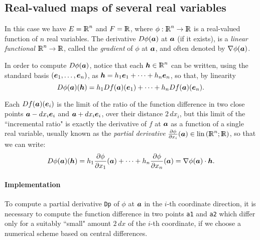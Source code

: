 \documentclass{31x47jw}
\begin{document}
\subsection{Real-valued maps of several real variables}

In this case we have $E = \mathbb{I\!\!R}^{n}$ and $F = \mathbb{I\!\!R}$, where
$\phi:\mathbb{I\!\!R}^{n}\rightarrow\mathbb{I\!\!R}$ is a real-valued function of $n$ real
variables.  The derivative $D{\phi}({\mbox{\boldmath $a$}})$ at ${\mbox{\boldmath $a$}}$ (if it exists),
is a \emph{linear functional} $\mathbb{I\!\!R}^{n} \rightarrow \mathbb{I\!\!R}$, called the
\emph{gradient} of ${\phi}$ at ${\mbox{\boldmath $a$}}$, and often denoted by $\nabla
\phi({\mbox{\boldmath $a$}})$.

In order to compute $D{\phi}({\mbox{\boldmath $a$}})$, notice that each ${\mbox{\boldmath $h$}}\in\mathbb{I\!\!R}^{n}$
can be written, using the standard basis $( {\mbox{\boldmath $e$}}_{1}, \ldots,
{\mbox{\boldmath $e$}}_{n} )$, as $ {\mbox{\boldmath $h$}} = h_{1}{\mbox{\boldmath $e$}}_{1} + \cdots + h_{n}{\mbox{\boldmath $e$}}_{n}$,
so that, by linearity
\[
D{\phi}({\mbox{\boldmath $a$}})({\mbox{\boldmath $h$}}) = h_{1}D{f}({\mbox{\boldmath $a$}})({\mbox{\boldmath $e$}}_{1}) + \cdots +
h_{n}D{f}({\mbox{\boldmath $a$}})({\mbox{\boldmath $e$}}_{n}).
\]

Each $D{f}({\mbox{\boldmath $a$}})({\mbox{\boldmath $e$}}_{i})$ is the limit of the ratio of the
function difference in two close points ${\mbox{\boldmath $a$}}-dx_{i}{\mbox{\boldmath $e$}}_{i}$ and
${\mbox{\boldmath $a$}}+dx_{i}{\mbox{\boldmath $e$}}_{i}$, over their distance $2\,dx_{i}$, but this
limit of the ``incremental ratio" is exactly the derivative of $f$ at
${\mbox{\boldmath $a$}}$ as a function of a single real variable, usually known as the
\emph{partial derivative} ${\partial \phi \over \partial x_{i}}({\mbox{\boldmath $a$}})
\in \mbox{\rm lin}\,(\mathbb{I\!\!R}^{n};\mathbb{I\!\!R})$, so that we can write:
\[
D{\phi}({\mbox{\boldmath $a$}})({\mbox{\boldmath $h$}}) = h_{1}{\partial \phi \over \partial x_{1}}({\mbox{\boldmath $a$}}) +
\cdots + h_{n}{\partial \phi \over \partial x_{n}}({\mbox{\boldmath $a$}}) 
= \nabla\phi({\mbox{\boldmath $a$}}) \cdot {\mbox{\boldmath $h$}}.
\]

\paragraph{Implementation}

To compute a partial derivative \texttt{Dp} of $\phi$ at ${\mbox{\boldmath $a$}}$ in
the $i$-th coordinate direction, it is necessary to compute the
function difference in two points \texttt{a1} and \texttt{a2} which
differ only for a suitably ``small" amount $2\,dx$ of the $i$-th
coordinate, if we choose a numerical scheme based on central
differences.
\end{document}
